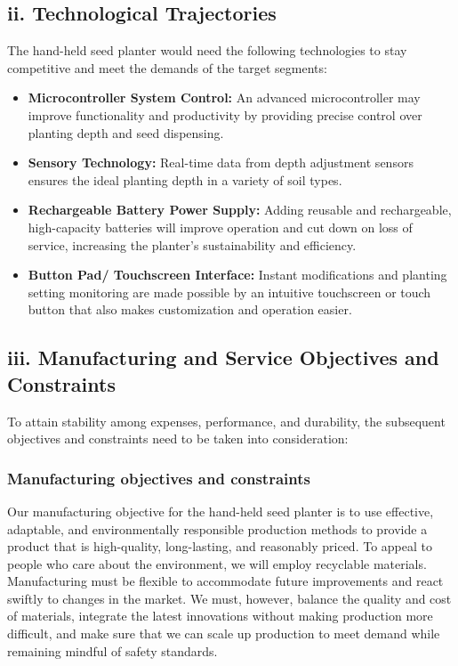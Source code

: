 \subsection*{ii. Technological Trajectories}
The hand-held seed planter would need the following technologies to stay competitive and meet the demands of the target segments:
\begin{itemize}
    \item \textbf{Microcontroller System Control:} An advanced microcontroller may improve functionality and productivity by providing precise control over planting depth and seed dispensing.
    \item \textbf{Sensory Technology:} Real-time data from depth adjustment sensors ensures the ideal planting depth in a variety of soil types.
    \item \textbf{Rechargeable Battery Power Supply:} Adding reusable and rechargeable, high-capacity batteries will improve operation and cut down on loss of service, increasing the planter's sustainability and efficiency.
    \item \textbf{Button Pad/ Touchscreen Interface:} Instant modifications and planting setting monitoring are made possible by an intuitive touchscreen or touch button that also makes customization and operation easier.
\end{itemize}

\subsection*{iii. Manufacturing and Service Objectives and Constraints}
To attain stability among expenses, performance, and durability, the subsequent objectives and constraints need to be taken into consideration:

\subsubsection*{Manufacturing objectives and constraints}
Our manufacturing objective for the hand-held seed planter is to use effective, adaptable, and environmentally responsible production methods to provide a product that is high-quality, long-lasting, and reasonably priced. To appeal to people who care about the environment, we will employ recyclable materials. Manufacturing must be flexible to accommodate future improvements and react swiftly to changes in the market. We must, however, balance the quality and cost of materials, integrate the latest innovations without making production more difficult, and make sure that we can scale up production to meet demand while remaining mindful of safety standards.

